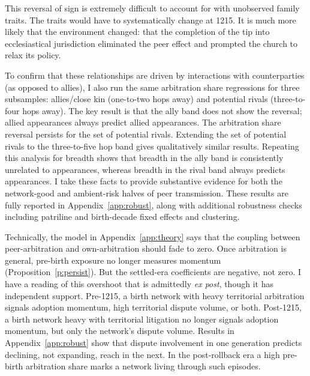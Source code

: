 \documentclass[12pt]{article}
\theoremstyle{definition}
\theoremstyle{remark}
\begin{document}
This reversal of sign is extremely difficult to account for with unobserved family traits. The traits would have to systematically change at 1215. It is much more likely that the environment changed: that the completion of the tip into ecclesiastical jurisdiction eliminated the peer effect and prompted the church to relax its policy.

To confirm that these relationships are driven by interactions with counterparties (as opposed to allies), I also run the same arbitration share regressions for three subsamples: allies/close kin (one-to-two hops away) and potential rivals (three-to-four hops away). The key result is that the ally band does not show the reversal; allied appearances always predict allied appearances. The arbitration share reversal persists for the set of potential rivals. Extending the set of potential rivals to the three-to-five hop band gives qualitatively similar results. Repeating this analysis for breadth shows that breadth in the ally band is consistently unrelated to appearances, whereas breadth in the rival band always predicts appearances. I take these facts to provide substantive evidence for both the network-good and ambient-risk halves of peer transmission. These results are fully reported in Appendix~\ref{app:robust}, along with additional robustness checks including patriline and birth-decade fixed effects and clustering.

Technically, the model in Appendix~\ref{app:theory} says that the coupling between peer-arbitration and own-arbitration should fade to zero. Once arbitration is general, pre-birth exposure no longer measures momentum (Proposition~\ref{p:persist}). But the settled-era coefficients are negative, not zero. I have a reading of this overshoot that is admittedly \textit{ex post}, though it has independent support. Pre-1215, a birth network with heavy territorial arbitration signals adoption momentum, high territorial dispute volume, or both. Post-1215, a birth network heavy with territorial litigation no longer signals adoption momentum, but only the network's dispute volume. Results in Appendix~\ref{app:robust} show that dispute involvement in one generation predicts declining, not expanding, reach in the next. In the post-rollback era a high pre-birth arbitration share marks a network living through such episodes.
\end{document}
